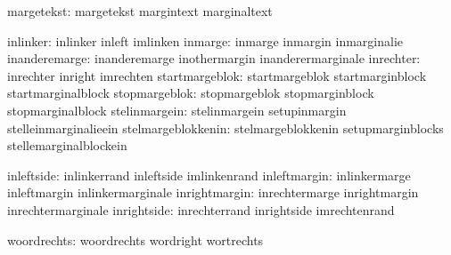 
                   margetekst:  margetekst                   margintext
                                marginaltext

                     inlinker:  inlinker                     inleft
                                imlinken
                      inmarge:  inmarge                      inmargin
                                inmarginalie
                inanderemarge:  inanderemarge                inothermargin
                                inanderermarginale
                    inrechter:  inrechter                    inright
                                imrechten
               startmargeblok:  startmargeblok               startmarginblock
                                startmarginalblock
                stopmargeblok:  stopmargeblok                stopmarginblock
                                stopmarginalblock
                stelinmargein:  stelinmargein                setupinmargin
                                stelleinmarginalieein
           stelmargeblokkenin:  stelmargeblokkenin           setupmarginblocks
                                stellemarginalblockein

                   inleftside:  inlinkerrand                 inleftside
                                imlinkenrand
                 inleftmargin:  inlinkermarge                inleftmargin
                                inlinkermarginale
                inrightmargin:  inrechtermarge               inrightmargin
                                inrechtermarginale
                  inrightside:  inrechterrand                inrightside
                                imrechtenrand

                  woordrechts:  woordrechts                  wordright
                                wortrechts

